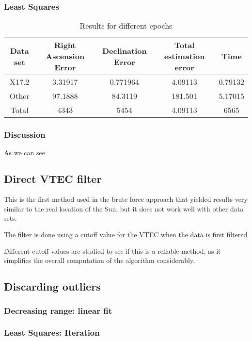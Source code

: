 \subsubsection{Least Squares}

\begin{table}[h!]
	\centering
	\def\arraystretch{1.2}
	\begin{tabular}{|c c c c c|} 
		\hline
		Data set & Right Ascension Error & Declination Error & Total estimation error & Time \\ [0.5ex] 
		\hline\hline
		X17.2 & 3.31917 & 0.771964 & 4.09113 & 0.79132 \\
		\hline
		Other & 97.1888 & 84.3119 & 181.501 & 5.17015 \\
		\hline\hline
		Total & 4343 & 5454 & 4.09113 & 6565 \\
		\hline
	\end{tabular}
	\caption{Results for different epochs}
\end{table}

\subsubsection{Discussion}

As we can see

\subsection{Direct VTEC filter}

This is the first method used in the brute force approach that yielded results very similar to the real location of the Sun, but it does not work well with other data sets.

The filter is done using a cutoff value for the VTEC when the data is first filtered

Different cutoff values are studied to see if this is a reliable method, as it simplifies the overall computation of the algorithm considerably.

\subsection{Discarding outliers}

\subsubsection{Decreasing range: linear fit}

\subsubsection{Least Squares: Iteration}


